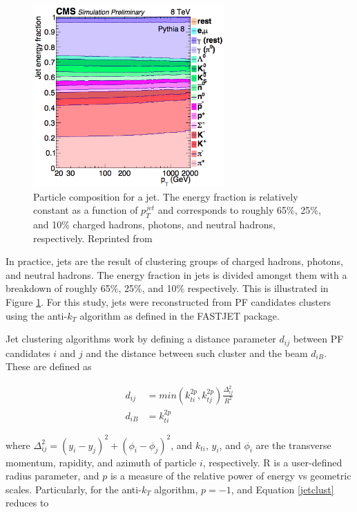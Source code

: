 \begin{figure}[h]
 	\centering
 	\includegraphics[width=0.65\textwidth]{figures/jme.png}
 	\singlespace
 	\caption{Particle composition for a jet. The energy fraction is relatively constant as a function of $p_{T}^{jet}$ and corresponds to roughly 65$\%$, 25$\%$, and 10$\%$ charged hadrons, photons, and neutral hadrons, respectively. Reprinted from \cite{Cacciari:2008gp}}
  	\label{fig:jme} 	
 \end{figure}

In practice, jets are the result of clustering groups of charged hadrons, photons, and neutral hadrons. The energy fraction in jets is divided amongst them with a breakdown of roughly 65$\%$, 25$\%$, and 10$\%$ respectively. This is illustrated in Figure \ref{fig:jme}. For this study, jets were reconstructed from PF candidates clusters using the anti-$k_{T}$ algorithm\cite{Cacciari:2008gp} as defined in the FASTJET package\cite{Cacciari:2011ma}.


 Jet clustering algorithms work by defining a distance parameter $d_{ij}$ between PF candidates $i$ and $j$ and the distance between such cluster and the beam $d_{iB}$. These are defined as

 \begin{align}
 \label{jetclust}
 d_{ij} &= min(k_{ti}^{2p},k_{tj}^{2p})\frac{\Delta_{ij}^{2}}{R^{2}}\\
 d_{iB} &= k_{ti}^{2p}
 \end{align}

where $\Delta_{ij}^{2} = (y_{i}-y_{j})^{2}+(\phi_{i}-\phi_{j})^{2}$, and $k_{ti}$, $y_{i}$, and $\phi_{i}$ are the transverse momentum, rapidity, and azimuth of particle $i$, respectively. R is a user-defined radius parameter, and $p$ is a measure of the relative power of energy vs geometric scales. Particularly, for the anti-$k_{T}$ algorithm, $p=-1$, and Equation \ref{jetclust} reduces to


